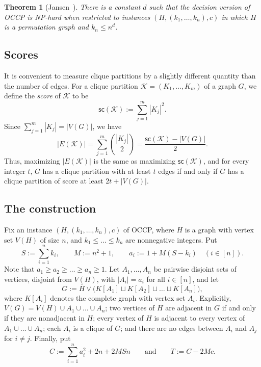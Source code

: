 \documentclass[a4paper,fleqn]{cas-sc}
\newtheorem{thm}{Theorem}[section]
\theoremstyle{remark}
\theoremstyle{plain}
\newcommand{\defn}[1]{\emph{#1}}
\newcommand{\score}{{\mathsf{sc}}}
\begin{document}
\begin{thm}[Jansen~\cite{JANSEN200054}] \label{thm:jansen}
    There is a constant $d$ such that the decision version of OCCP is NP-hard when restricted to instances $(H, (k_1, \dots, k_n), c)$ in which $H$ is a permutation graph and $k_n \leq n^d$.
\end{thm}

\subsection{Scores}

It is convenient to measure clique partitions by a slightly different quantity than the number of edges.  For a clique partition $\mathcal{K}=(K_1, \dots, K_m)$ of a graph $G$, we define the \defn{score} of $\mathcal{K}$ to be
\[
    \score(\mathcal{K}) := \sum_{j=1}^m |K_j|^2.
\]
Since $\sum_{j=1}^m |K_j| = |V(G)|$, we have
\begin{equation} \label{eq:score}
    |E(\mathcal{K})| = \sum_{j=1}^m \binom{|K_j|}{2} = \frac{\score(\mathcal{K}) - |V(G)|}{2}.
\end{equation}
Thus, maximizing $|E(\mathcal{K})|$ is the same as maximizing $\score(\mathcal{K})$, and for every integer $t$, $G$ has a clique partition with at least $t$ edges if and only if $G$ has a clique partition of score at least $2t+|V(G)|$.

\subsection{The construction}

Fix an instance $(H, (k_1, \dots, k_n), c)$ of OCCP, where $H$ is a graph with vertex set $V(H)$ of size $n$, and $k_1 \leq \dots \leq k_n$ are nonnegative integers.  Put
\[
    S := \sum_{i=1}^n k_i, \qquad M := n^2+1, \qquad a_i := 1 + M(S-k_i) \quad (i \in [n]).
\]
Note that $a_1 \geq a_2 \geq \dots \geq a_n \geq 1$.  Let $A_1, \dots, A_n$ be pairwise disjoint sets of vertices, disjoint from $V(H)$, with $|A_i|=a_i$ for all $i \in [n]$, and let
\[
    G := \overline{H} \vee \bigl(K[A_1] \sqcup K[A_2] \sqcup \dots \sqcup K[A_n]\bigr),
\]
where $K[A_i]$ denotes the complete graph with vertex set $A_i$.  Explicitly, $V(G)=V(H) \cup A_1 \cup \dots \cup A_n$; two vertices of $H$ are adjacent in $G$ if and only if they are nonadjacent in $H$; every vertex of $H$ is adjacent to every vertex of $A_1 \cup \dots \cup A_n$; each $A_i$ is a clique of $G$; and there are no edges between $A_i$ and $A_j$ for $i \neq j$.  Finally, put
\begin{equation} \label{eq:C}
    C := \sum_{i=1}^n a_i^2 + 2n + 2MSn
    \qquad\text{and}\qquad
    T := C - 2Mc.
\end{equation}
\end{document}
